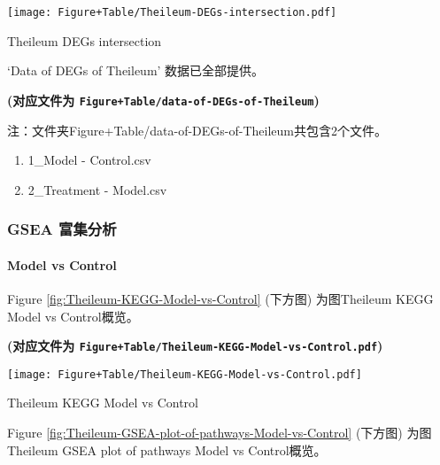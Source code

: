 \documentclass[
]{article}
\providecommand{\tightlist}{%
  \setlength{\itemsep}{0pt}\setlength{\parskip}{0pt}}
\begin{document}
\def\@captype{figure}
\begin{center}
\texttt{[image: Figure+Table/Theileum-DEGs-intersection.pdf]}
\caption{Theileum DEGs intersection}\label{fig:Theileum-DEGs-intersection}
\end{center}

`Data of DEGs of Theileum' 数据已全部提供。

\textbf{(对应文件为 \texttt{Figure+Table/data-of-DEGs-of-Theileum})}

\begin{center}\begin{tcolorbox}[colback=gray!10, colframe=gray!50, width=0.9\linewidth, arc=1mm, boxrule=0.5pt]注：文件夹Figure+Table/data-of-DEGs-of-Theileum共包含2个文件。

\begin{enumerate}\tightlist
\item 1\_Model - Control.csv
\item 2\_Treatment - Model.csv
\end{enumerate}\end{tcolorbox}
\end{center}

\hypertarget{gsea-ux5bccux96c6ux5206ux6790-1}{%
\subsubsection{GSEA 富集分析}\label{gsea-ux5bccux96c6ux5206ux6790-1}}

\hypertarget{model-vs-control-1}{%
\paragraph{Model vs Control}\label{model-vs-control-1}}

Figure \ref{fig:Theileum-KEGG-Model-vs-Control} (下方图) 为图Theileum KEGG Model vs Control概览。

\textbf{(对应文件为 \texttt{Figure+Table/Theileum-KEGG-Model-vs-Control.pdf})}

\def\@captype{figure}
\begin{center}
\texttt{[image: Figure+Table/Theileum-KEGG-Model-vs-Control.pdf]}
\caption{Theileum KEGG Model vs Control}\label{fig:Theileum-KEGG-Model-vs-Control}
\end{center}

Figure \ref{fig:Theileum-GSEA-plot-of-pathways-Model-vs-Control} (下方图) 为图Theileum GSEA plot of pathways Model vs Control概览。
\end{document}
